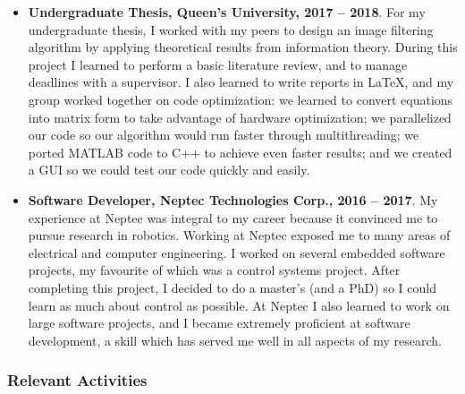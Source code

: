\documentclass[a4paper,12pt]{article}
\begin{document}
\begin{itemize}
    \item \textbf{Undergraduate Thesis, Queen's University, 2017 -- 2018}.
        For my undergraduate thesis, I worked with my peers to design an image
        filtering algorithm by applying theoretical results from information theory.
        During this project I learned to perform a basic literature review,
        and to manage deadlines with a supervisor.
        I also learned to write reports in LaTeX,
        and my group worked together on code optimization: we learned to
        convert equations into matrix form to take advantage of hardware
        optimization; we parallelized our code so our algorithm would run faster
        through multithreading; we ported MATLAB code to C++ to achieve even
        faster results; and we created a GUI so we could test our code quickly
        and easily.

    \item \textbf{Software Developer, Neptec Technologies Corp., 2016 -- 2017}.
        My experience at Neptec was integral to my career because it convinced
        me to pursue research in robotics.
        Working at Neptec exposed me to many areas of electrical and computer
        engineering.
        I worked on several embedded software projects, my favourite of which
        was a control systems project.
        After completing this project, I decided to do a master's (and a PhD) so I
        could learn as much about control as possible.
        At Neptec I also learned to work on large software projects,
        and I became extremely proficient at software development, a skill which
        has served me well in all aspects of my research.
        
\end{itemize}

\subsubsection*{Relevant Activities}
\end{document}
